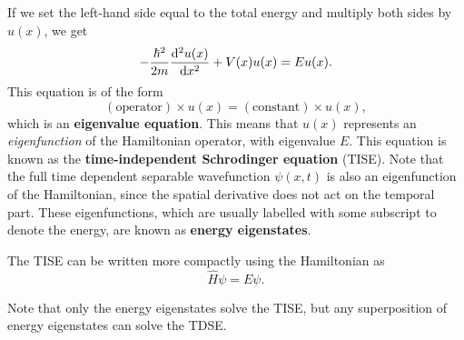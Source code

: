 \documentclass[../quantum_mechanics.tex]{subfiles}
\begin{document}
            If we set the left-hand side equal to the total energy and multiply both sides by $u(x)$, we get
            \begin{equation}\label{eq:tise}
                -\frac{\hbar^2}{2m}\dv[2]{u(x)}{x}+V(x)u(x)=Eu(x).
            \end{equation}
            This equation is of the form
            \begin{equation}
                (\text{operator})\times u(x)=(\text{constant})\times u(x),
            \end{equation}
            which is an \textbf{eigenvalue equation}.
            This means that $u(x)$ represents an \textit{eigenfunction} of the Hamiltonian operator, with eigenvalue $E$.
            This equation is known as the \textbf{time-independent Schrodinger equation} (TISE).
            Note that the full time dependent separable wavefunction $\psi(x,t)$ is also an eigenfunction of the Hamiltonian, since the spatial derivative does not act on the temporal part.
            These eigenfunctions, which are usually labelled with some subscript to denote the energy, are known as \textbf{energy eigenstates}.

            The TISE can be written more compactly using the Hamiltonian as
            \begin{equation}
                \hat{H}\psi=E\psi.
            \end{equation}

            Note that only the energy eigenstates solve the TISE, but any superposition of energy eigenstates can solve the TDSE.
\end{document}
